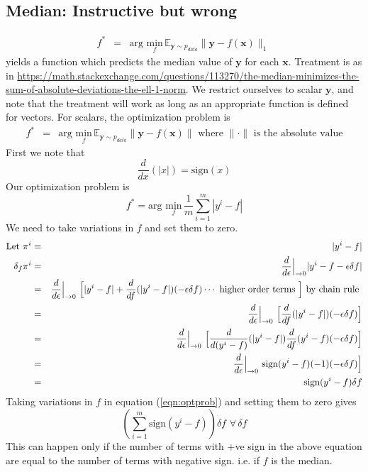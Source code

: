 \documentclass{article}
\newcommand{\beq}{\begin{equation}}
\newcommand{\eeq}{\end{equation}}
\newcommand{\ber}{\begin{eqnarray}}
\newcommand{\eer}{\end{eqnarray}}
\newcommand{\dd}[2]{\frac{d}{d{#2}}{(#1)} }
\newcommand{\ddeps}{\frac{d}{d\epsilon}\Big{|}_{\rightarrow{0}}}
\begin{document}
\subsection{Median: Instructive but wrong}
\ber
f^{*} &=& \text{arg } \underset{f}{\text{min}}\, {\mathbb{E}}_{\pmb{y}\sim{p_{data}}}\|{\pmb{y}}-f(\pmb{x})\|_1 \
\eer
yields a function which predicts the median value of $\pmb{y}$ for each $\pmb{x}$. Treatment is as in \url{https://math.stackexchange.com/questions/113270/the-median-minimizes-the-sum-of-absolute-deviations-the-ell-1-norm}. We restrict ourselves to scalar $\pmb{y}$, and note that the treatment will work as long as an appropriate  function is defined for vectors. For scalars, the optimization problem is
\ber
f^{*} &=& \text{arg } \underset{f}{\text{min}}\, {\mathbb{E}}_{\pmb{y}\sim{p_{data}}}\|{\pmb{y}}-f(\pmb{x})\| \text{ where } \|\cdot\| \text{ is the absolute value}
\eer
First we note that
\beq
\dd{|x|}{x} = \text{sign}(x)
\eeq
Our optimization problem is
\beq
\label{eqn:optprob}
f^{*} = \text{arg } \underset{f}{\text{min}}\, \frac{1}{m}\sum_{i=1}^{m}|y^{i}-f|
\eeq
We need to take variations in $f$ and set them to zero.
\ber
\text{Let }\pi^{i} &=& |y^{i}-f| \\
\delta_f \pi^{i} &=& \ddeps|y^{i}-f-\epsilon\delta{f}|\\
&=& \ddeps \,\, \Big{[} |y^{i}-f| + \dd{|y^{i}-f|}{f}(-\epsilon\delta{f}) \cdots \text{ higher order terms }\Big{]} \text{ by chain rule } \\
&=& \ddeps \,\, \Big{[}  \dd{|y^{i}-f|}{f}(-\epsilon\delta{f})\Big{]}\\
&=& \ddeps \,\, \Big{[} \dd{|y^{i}-f|}{(y^{i}-f)}\dd{y^{i}-f}{f}(-\epsilon\delta{f})\Big{]}\\
&=&  \ddeps \,\, \text{sign}(y^{i}-f)(-1)(-\epsilon\delta{f})\Big{]}\\
&=& \text{sign}(y^{i}-f)\delta{f}  
\eer
Taking variations in $f$ in equation (\ref{eqn:optprob}) and setting them to zero gives
\beq
(\sum_{i=1}^{m}\text{sign}(y^{i}-f))\delta{f} \,\, \forall\, \delta{f}
\eeq
This can happen only if the number of terms with +ve sign in the above equation are equal to the number of terms with negative sign. i.e. if $f$ is the median.
\end{document}
